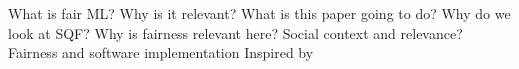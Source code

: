 What is fair ML? Why is it relevant? What is this paper going to do?
Why do we look at SQF? Why is fairness relevant here? Social context and relevance?
Fairness and software implementation
Inspired by \cite{verma2018} \cite{caton2024} \cite{castelnovo2022}
